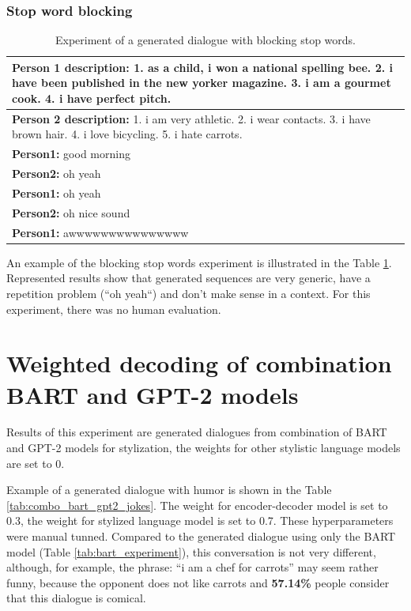 \subsubsection{Stop word blocking}
\begin{table}[H]
\centering
 \begin{tabular}{|p{14cm}|} 
 \hline
 \textbf{Person 1 description:} 1. as a child, i won a national spelling bee. 2. i have been published in the new yorker magazine. 3. i am a gourmet cook. 4. i have perfect pitch. \\
 \hline
 \textbf{Person 2 description:} 1. i am very athletic. 2. i wear contacts. 3. i have brown hair. 4. i love bicycling. 5. i hate carrots. \\
 \hline
 \textbf{Person1:} good morning \\
 \textbf{Person2:} oh yeah \\
 \textbf{Person1:} oh yeah \\
 \textbf{Person2:} oh nice sound \\
 \textbf{Person1:} awwwwwwwwwwwwwww \\
 \hline
 \end{tabular}
 \caption{Experiment of a generated dialogue with blocking stop words.}
\label{tab:stop_words}
\end{table}
An example of the blocking stop words experiment is illustrated in the Table \ref{tab:stop_words}. Represented results show that generated sequences are very generic, have a repetition problem (``oh yeah``) and don't make sense in a context. For this experiment, there was no human evaluation.

\section{Weighted decoding of combination BART and GPT-2 models}
Results of this experiment are generated dialogues from combination of BART and GPT-2 models for stylization, the weights for other stylistic language models are set to 0.

Example of a generated dialogue with humor is shown in the Table \ref{tab:combo_bart_gpt2_jokes}. The weight for encoder-decoder model is set to 0.3, the weight for stylized language model is set to 0.7. These hyperparameters were manual tunned. Compared to the generated dialogue using only the BART model (Table \ref{tab:bart_experiment}), this conversation is not very different, although, for example, the phrase: ``i am a chef for carrots'' may seem rather funny, because the opponent does not like carrots and \textbf{57.14\%} people consider that this dialogue is comical.

